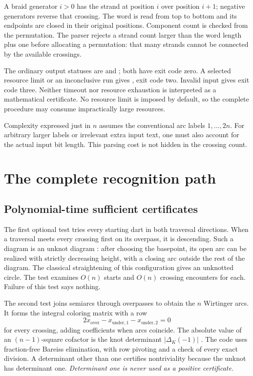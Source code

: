 \documentclass[11pt]{article}
\theoremstyle{remark}\newtheorem{remark}[theorem]{Remark}
\newcommand{\code}[1]{\texttt{\detokenize{#1}}}
\begin{document}
A braid generator $i>0$ has the strand at position $i$ over position $i+1$;
negative generators reverse that crossing. The word is read from top to
bottom and its endpoints are closed in their original positions. Component
count is checked from the permutation. The parser rejects a strand count
larger than the word length plus one before allocating a permutation: that
many strands cannot be connected by the available crossings.

The ordinary output statuses are \code{unknot} and \code{knotted}; both have
exit code zero. A selected resource limit or an inconclusive
\code{--fast-only} run gives \code{unknown}, exit code two. Invalid input gives
exit code three. Neither timeout nor resource exhaustion is interpreted as a
mathematical certificate. No resource limit is imposed by default, so the
complete procedure may consume impractically large resources.

Complexity expressed just in $n$ assumes the conventional arc labels
$1,\dots,2n$. For arbitrary larger labels or irrelevant extra input text, one
must also account for the actual input bit length. This parsing cost is not
hidden in the crossing count.

\section{The complete recognition path}
\subsection{Polynomial-time sufficient certificates}
The first optional test tries every starting dart in both traversal directions.
When a traversal meets every crossing first on its overpass, it is descending.
Such a diagram is an unknot diagram \cite{descending}: after choosing the
basepoint, its open arc can be realized with strictly decreasing height, with
a closing arc outside the rest of the diagram. The classical straightening of
this configuration gives an unknotted circle. The test examines $O(n)$ starts
and $O(n)$ crossing encounters for each. Failure of this test says nothing.

The second test joins semiarcs through overpasses to obtain the $n$ Wirtinger
arcs. It forms the integral coloring matrix with a row
\[
 2x_{\mathrm{over}}-x_{\mathrm{under},1}-x_{\mathrm{under},2}=0
\]
for every crossing, adding coefficients when arcs coincide. The absolute
value of an $(n-1)$-square cofactor is the knot determinant
$|\Delta_K(-1)|$ \cite{kolay}. The code uses fraction-free Bareiss elimination,
with row pivoting and a check of every exact division. A determinant other
than one certifies nontriviality because the unknot has determinant one.
\emph{Determinant one is never used as a positive certificate.}
\end{document}

